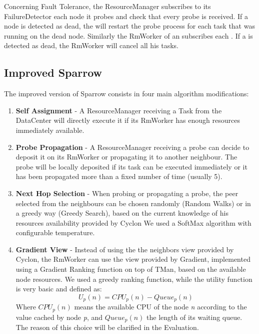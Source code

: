 \documentclass[conference]{IEEEtran}
\begin{document}
 Concerning Fault Tolerance, the ResourceManager subscribes to its FailureDetector each node it probes and check that every probe is received. If a node is detected as dead, the \tmast will restart the probe process for each task that was running on the dead node. Similarly the RmWorker of an \exc subscribes each \tmast. If a \tmast is detected as dead, the RmWorker will cancel all his tasks.
  

  \subsection{Improved Sparrow}
  The improved version of Sparrow consists in four main algorithm modifications:
   \begin{enumerate}

  \item \textbf{Self Assignment }- A ResourceManager receiving a Task from the DataCenter will directly execute it if its RmWorker has enough resources immediately available.
  
  \item \textbf{Probe Propagation} - A ResourceManager receiving a probe can decide to deposit it on its RmWorker or propagating it to another neighbour.  The probe will be locally deposited if its task can be executed immediately or it has been propagated more than a fixed number of time (usually 5).
  
   \item \textbf{Next Hop Selection} - When probing or propagating a probe, the peer selected from the neighbours can be chosen randomly (Random Walks) or in a greedy way (Greedy Search), based on the current knowledge of his resources availability provided by Cyclon We used a SoftMax algorithm with configurable temperature.
  
  \item \textbf{Gradient View} - Instead of using the the neighbors view provided by Cyclon, the RmWorker can use the view provided by Gradient, implemented using a Gradient Ranking function on top of TMan, based on the available node resources. We used a greedy ranking function, while the utility function is very basic and defined as:
\begin{equation}
 U_p(n) = CPU_p(n) - Queue_p(n)
\end{equation}
Where $CPU_p(n)$ means the available CPU of the node \textit{n} according to the value cached by node\textit{ p}, and $Queue_p(n)$ the length of its waiting queue.
   The reason of this choice will be clarified in the Evaluation.
  
  \end{enumerate}
\end{document}
